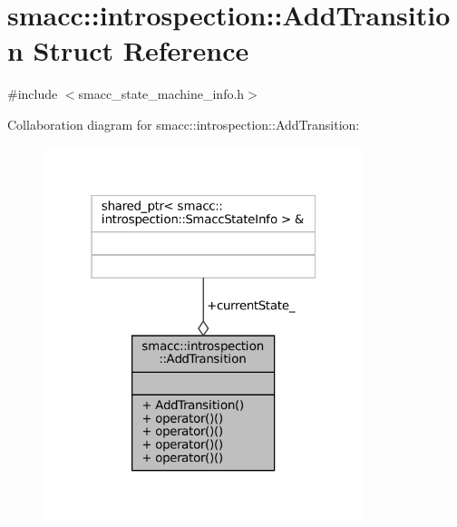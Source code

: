 \hypertarget{structsmacc_1_1introspection_1_1AddTransition}{}\section{smacc\+:\+:introspection\+:\+:Add\+Transition Struct Reference}
\label{structsmacc_1_1introspection_1_1AddTransition}


{\ttfamily \#include $<$smacc\+\_\+state\+\_\+machine\+\_\+info.\+h$>$}



Collaboration diagram for smacc\+:\+:introspection\+:\+:Add\+Transition\+:
\nopagebreak
\begin{figure}[H]
\begin{center}
\leavevmode
\includegraphics[width=265pt]{structsmacc_1_1introspection_1_1AddTransition__coll__graph}
\end{center}
\end{figure}
